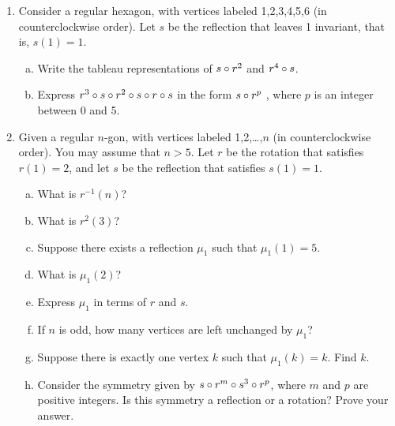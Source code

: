\begin{enumerate}

\item
Consider a regular hexagon, with vertices labeled 1,2,3,4,5,6 (in counterclockwise order). Let $s$ be the reflection that  leaves 1 invariant, that is, $s(1) = 1$.
\begin{enumerate}[(a)]
\item
Write the tableau representations of $s \circ r^2$ and $ r^4 \circ s$.
\item
Express $r^3 \circ  s \circ  r^2 \circ  s \circ  r\circ s$ in the form $s \circ r^p$ , where $p$ is an integer between 0 and 5.
\end{enumerate}

\item
Given a regular $n$-gon, with vertices labeled 1,2,…,$n$ (in counterclockwise order).  You may assume that $n>5$. Let $r$ be the rotation that satisfies $r(1)=2$, and let $s$ be the reflection that satisfies $s(1)=1$.
\begin{enumerate}[(a)]
\item
What is $r^{-1}(n)$?
\item
What is $r^2(3)$?  
\item
Suppose there exists a reflection $\mu_1$ such that $\mu_1(1)=5$. 
\item
What is  $\mu_1(2)$?
\item  
Express $\mu_1$ in terms of $r$ and $s$.
\item
If $n$ is odd, how many vertices are left unchanged by $\mu_1$?
\item 
Suppose there is exactly one vertex $k$ such that  $\mu_1(k)=k$.  Find $k$.
\item 
Consider the symmetry given by $s \circ r^m \circ s^3 \circ r^p$, where $m$ and $p$ are positive integers. Is this symmetry a reflection or a rotation?  Prove your answer. 
\end{enumerate}


\end{enumerate}




